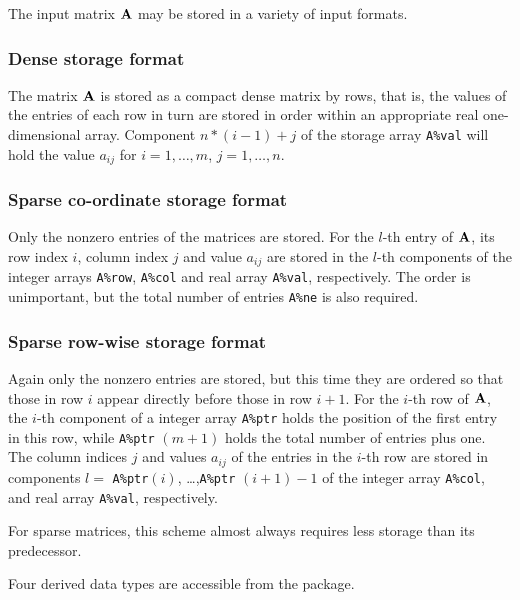 \documentclass{galahad}
\begin{document}
\galmatrix
The input matrix ${\mathbf{A}}$ may be stored in a variety of input formats.

\subsubsection{Dense storage format}\label{dense}
The matrix ${\mathbf{A}}$ is stored as a compact
dense matrix by rows, that is, the values of the entries of each row in turn are
stored in order within an appropriate real one-dimensional array.
Component $n \ast (i-1) + j$ of the storage array {\tt A\%val} will hold the
value $a_{ij}$ for $i = 1, \ldots , m$, $j = 1, \ldots , n$.

\subsubsection{Sparse co-ordinate storage format}\label{coordinate}
Only the nonzero entries of the matrices are stored. For the
$l$-th entry of ${\mathbf{A}}$, its row index $i$, column index $j$
and value $a_{ij}$
are stored in the $l$-th components of the integer arrays {\tt A\%row},
{\tt A\%col} and real array {\tt A\%val}, respectively.
The order is unimportant, but the total
number of entries {\tt A\%ne} is also required.

\subsubsection{Sparse row-wise storage format}\label{rowwise}
Again only the nonzero entries are stored, but this time
they are ordered so that those in row $i$ appear directly before those
in row $i+1$. For the $i$-th row of ${\mathbf{A}}$, the $i$-th component of a
integer array {\tt A\%ptr} holds the position of the first entry in this row,
while {\tt A\%ptr} $(m+1)$ holds the total number of entries plus one.
The column indices $j$ and values $a_{ij}$ of the entries in the $i$-th row
are stored in components
$l =$ {\tt A\%ptr}$(i)$, \ldots ,{\tt A\%ptr} $(i+1)-1$ of the
integer array {\tt A\%col}, and real array {\tt A\%val}, respectively.

For sparse matrices, this scheme almost always requires less storage than
its predecessor.


%


\galtypes
Four derived data types are accessible from the package.
\end{document}
